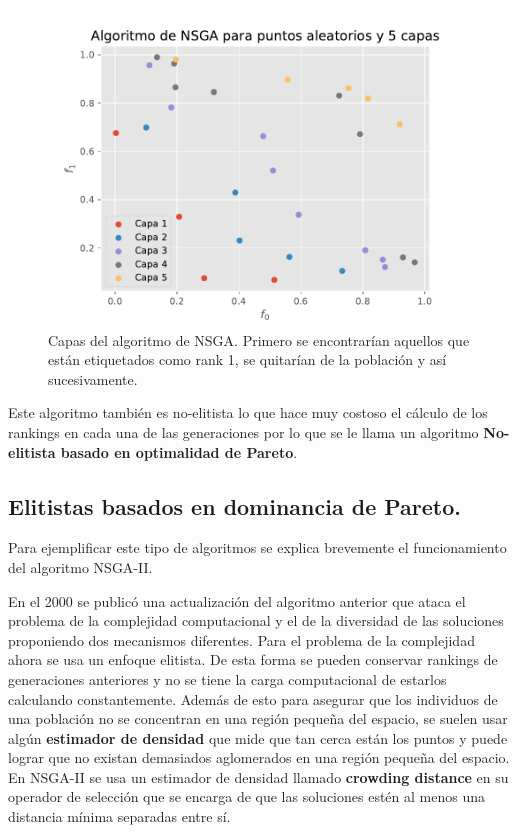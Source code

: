 \begin{figure}[H]
    \centering
    \includegraphics[width=\textwidth]{Figuras/nds.pdf}
    \caption[NSGA]{Capas del algoritmo de NSGA. Primero se encontrarían aquellos que están etiquetados como rank 1, se quitarían de la población y así sucesivamente.}
    \label{fig:nsga1}
\end{figure}


Este algoritmo también es no-elitista lo que hace muy costoso el cálculo de los rankings en cada una de las generaciones por lo que se le llama un algoritmo \textbf{No-elitista basado en optimalidad de Pareto}.

\subsection*{Elitistas basados en dominancia de Pareto.} \label{sec:nsga2}

Para ejemplificar este tipo de algoritmos se explica brevemente el funcionamiento del algoritmo NSGA-II.  

En el 2000 se publicó \cite{debFastElitistNondominated2000} una actualización del algoritmo anterior que ataca el problema de la complejidad computacional y el de la diversidad de las soluciones proponiendo dos mecanismos diferentes. Para el problema de la complejidad ahora se usa un enfoque elitista. De esta forma se pueden conservar rankings de generaciones anteriores y no se tiene la carga computacional de estarlos calculando constantemente. Además de esto para asegurar que los individuos de una población no se concentran en una región pequeña del espacio, se suelen usar algún \textbf{estimador de densidad} que mide que tan cerca están los puntos y puede lograr que no existan demasiados aglomerados en una región pequeña del espacio. En NSGA-II se usa un estimador de densidad llamado \textbf{crowding distance} en su operador de selección que se encarga de que las soluciones estén al menos una distancia mínima separadas entre sí. 


